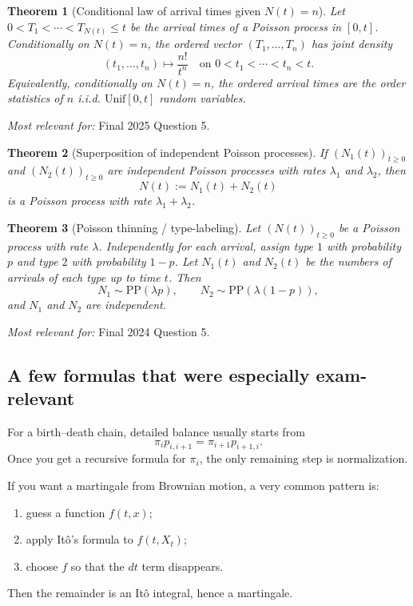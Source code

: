 \documentclass[11pt]{article}
\newtheorem{theorem}{Theorem}[section]
\theoremstyle{definition}
\begin{document}
\begin{theorem}[Conditional law of arrival times given $N(t)=n$]
Let $0<T_1<\cdots<T_{N(t)}\le t$ be the arrival times of a Poisson process in $[0,t]$. Conditionally on $N(t)=n$, the ordered vector $(T_1,\dots,T_n)$ has joint density
\[
(t_1,\dots,t_n) \mapsto \frac{n!}{t^n}
\quad \text{on } 0<t_1<\cdots<t_n<t.
\]
Equivalently, conditionally on $N(t)=n$, the ordered arrival times are the order statistics of $n$ i.i.d. $\mathrm{Unif}[0,t]$ random variables.
\end{theorem}

\emph{Most relevant for:} Final 2025 Question 5.

\begin{theorem}[Superposition of independent Poisson processes]
If $(N_1(t))_{t\ge 0}$ and $(N_2(t))_{t\ge 0}$ are independent Poisson processes with rates $\lambda_1$ and $\lambda_2$, then
\[
N(t):=N_1(t)+N_2(t)
\]
is a Poisson process with rate $\lambda_1+\lambda_2$.
\end{theorem}

\begin{theorem}[Poisson thinning / type-labeling]
Let $(N(t))_{t\ge 0}$ be a Poisson process with rate $\lambda$. Independently for each arrival, assign type $1$ with probability $p$ and type $2$ with probability $1-p$. Let $N_1(t)$ and $N_2(t)$ be the numbers of arrivals of each type up to time $t$. Then
\[
N_1 \sim \mathrm{PP}(\lambda p),
\qquad
N_2 \sim \mathrm{PP}(\lambda(1-p)),
\]
and $N_1$ and $N_2$ are independent.
\end{theorem}

\emph{Most relevant for:} Final 2024 Question 5.

\subsection{A few formulas that were especially exam-relevant}

\begin{keyformula}
For a birth--death chain, detailed balance usually starts from
\[
\pi_i p_{i,i+1} = \pi_{i+1} p_{i+1,i}.
\]
Once you get a recursive formula for $\pi_i$, the only remaining step is normalization.
\end{keyformula}

\begin{keyformula}
If you want a martingale from Brownian motion, a very common pattern is:
\begin{enumerate}[label=(\roman*)]
    \item guess a function $f(t,x)$;
    \item apply It\^o's formula to $f(t,X_t)$;
    \item choose $f$ so that the $dt$ term disappears.
\end{enumerate}
Then the remainder is an It\^o integral, hence a martingale.
\end{keyformula}
\end{document}
